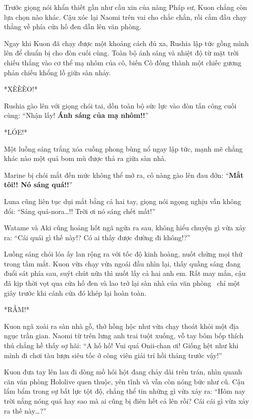 \documentclass[../main.tex]{subfiles}
\begin{document}
Trước giọng nói khẩn thiết gần như cầu xin của nàng Pháp sư, Kuon chẳng còn lựa chọn nào khác. Cậu xóc lại Naomi trên vai cho chắc chắn, rồi cắm đầu chạy thẳng về phía cửa hố đen dẫn lên văn phòng.

Ngay khi Kuon đã chạy được một khoảng cách đủ xa, Rushia lập tức gồng mình lên để chuẩn bị cho đòn cuối cùng. Toàn bộ ánh sáng và nhiệt độ từ mặt trời chiếu thẳng vào cơ thể mạ nhôm của cô, biến Cô đồng thành một chiếc gương phản chiếu khổng lồ giữa sàn nhảy.

*XÈÈÈO!*

Rushia gào lên với giọng chói tai, dồn toàn bộ sức lực vào đòn tấn công cuối cùng: ``Nhận lấy! \textbf{Ánh sáng của mạ nhôm!!}''


*LÓE!*

Một luồng sáng trắng xóa cuồng phong bùng nổ ngay lập tức, mạnh mẽ chẳng khác nào một quả bom mù được thả ra giữa sàn nhà.

Marine bị chói mắt đến mức không thể mở ra, cô nàng gào lên đau đớn: ``\textbf{Mắt tôi!! Nó sáng quá!!}''

Luna cũng liên tục dụi mắt bằng cả hai tay, giọng nói ngọng nghịu vẫn không đổi: ``Sáng quá-nora\dots!! Trời ơi nó sáng chết mất!''

Watame và Aki cũng hoảng hốt ngã ngửa ra sau, không hiểu chuyện gì vừa xảy ra: ``Cái quái gì thế này!? Có ai thấy được đường đi không!?''

Luồng sáng chói lóa ấy lan rộng ra với tốc độ kinh hoàng, nuốt chửng mọi thứ trong tầm mắt. Kuon vừa chạy vừa ngoái đầu nhìn lại, thấy quầng sáng đang đuổi sát phía sau, suýt chút nữa thì nuốt lấy cả hai anh em. Rất may mắn, cậu đã kịp thời vọt qua cửa hố đen và lao trở lại sàn nhà của văn phòng \hll\ chỉ một giây trước khi cánh cửa đó khép lại hoàn toàn.

*RẦM!*

Kuon ngã xoài ra sàn nhà gỗ, thở hồng hộc như vừa chạy thoát khỏi một địa ngục trần gian. Naomi từ trên lưng anh trai tuột xuống, vỗ tay bôm bốp thích thú chẳng hề thấy sợ hãi: ``A hố hố! Vui quá Onii-chan ơi! Giống hệt như khi mình đi chơi tàu lượn siêu tốc ở công viên giải trí hồi tháng trước vậy!''

Kuon đưa tay lên lau đi dòng mồ hôi hột đang chảy dài trên trán, nhìn quanh căn văn phòng Hololive quen thuộc, yên tĩnh và vẫn còn nóng bức như cũ. Cậu lẩm bẩm trong sự bất lực tột độ, chẳng thể tin những gì vừa xảy ra: ``Hôm nay trời nắng nóng quá hay sao mà ai cũng bị điên hết cả lên rồi? Cái cái gì vừa xảy ra thế này\dots?''
\end{document}
